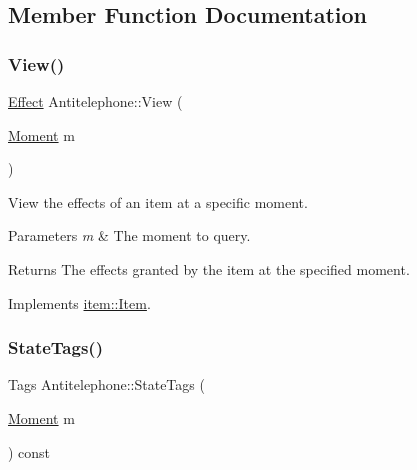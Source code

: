 \subsection{Member Function Documentation}
\mbox{\label{classitem_1_1_antitelephone_aa44819e9242edbdfdfc4f14b5d2b34ec}} 
\subsubsection{\texorpdfstring{View()}{View()}}
{\footnotesize\ttfamily \hyperlink{classitem_1_1_effect}{Effect} Antitelephone\+::\+View (\begin{DoxyParamCaption}\item[{\hyperlink{classtimeplane_1_1_moment}{Moment}}]{m }\end{DoxyParamCaption})\hspace{0.3cm}{\ttfamily [virtual]}}



View the effects of an item at a specific moment. 


\begin{DoxyParams}{Parameters}
{\em m} & The moment to query. \\
\hline
\end{DoxyParams}
\begin{DoxyReturn}{Returns}
The effects granted by the item at the specified moment. 
\end{DoxyReturn}


Implements \hyperlink{classitem_1_1_item_a400dfeabc4056d36bfd348ff9c51cf7d}{item\+::\+Item}.

\mbox{\label{classitem_1_1_antitelephone_a0322847417981b9acd4b323c35e728f0}} 
\subsubsection{\texorpdfstring{State\+Tags()}{StateTags()}}
{\footnotesize\ttfamily Tags Antitelephone\+::\+State\+Tags (\begin{DoxyParamCaption}\item[{\hyperlink{classtimeplane_1_1_moment}{Moment}}]{m }\end{DoxyParamCaption}) const\hspace{0.3cm}{\ttfamily [virtual]}}



